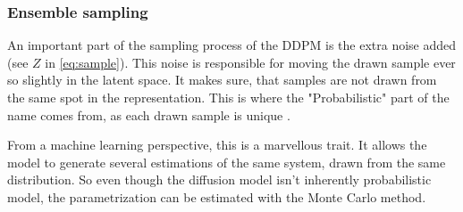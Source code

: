 \subsubsection{Ensemble sampling}

An important part of the sampling process of the DDPM is the extra noise added (see $Z$ in \autoref{eq:sample}). This noise is responsible for moving the drawn sample ever so slightly in the latent space. It makes sure, that samples are not drawn from the same spot in the representation. This is where the "Probabilistic" part of the name comes from, as each drawn sample is unique \cite{ddpm}. 

From a machine learning perspective, this is a marvellous trait. It allows the model to generate several estimations of the same system, drawn from the same distribution. So even though the diffusion model isn't inherently probabilistic model, the parametrization can be estimated with the Monte Carlo method.




